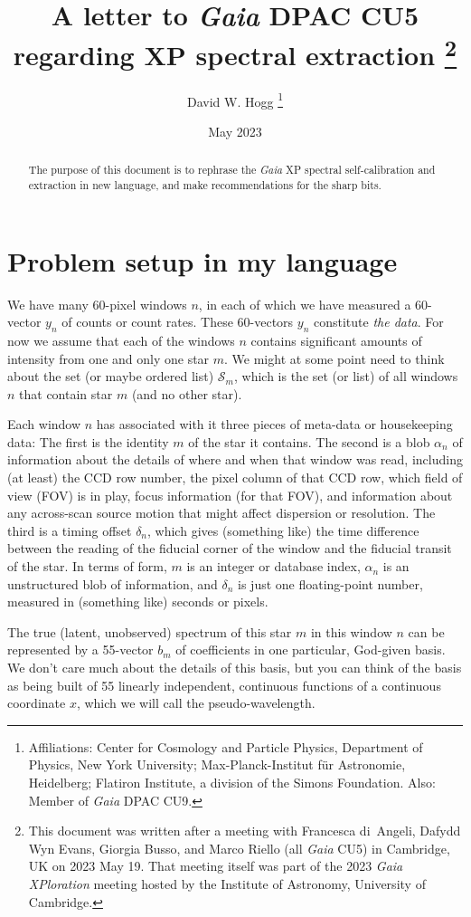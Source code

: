 \documentclass[11pt]{article}
\title{\bfseries
A letter to \textsl{Gaia} DPAC CU5 regarding XP spectral extraction%
\footnote{This document was written after a meeting with Francesca di~Angeli, Dafydd Wyn Evans, Giorgia Busso, and Marco Riello (all \textsl{Gaia} CU5) in Cambridge, UK on 2023 May 19. That meeting itself was part of the 2023 \textsl{Gaia XPloration} meeting hosted by the Institute of Astronomy, University of Cambridge.}}
\author{David W. Hogg%
\footnote{Affiliations: Center for Cosmology and Particle Physics, Department of Physics, New York University; Max-Planck-Institut f\"ur Astronomie, Heidelberg; Flatiron Institute, a division of the Simons Foundation. Also: Member of \textsl{Gaia} DPAC CU9.}}
\date{May 2023}
\begin{document}
\maketitle\thispagestyle{empty}

\begin{abstract}\noindent
    The purpose of this document is to rephrase the \textsl{Gaia} XP spectral self-calibration and extraction in new language, and make recommendations for the sharp bits.
\end{abstract}

\section{Problem setup in my language}

We have many 60-pixel windows $n$, in each of which we have measured a 60-vector $y_n$ of counts or count rates.
These 60-vectors $y_n$ constitute \emph{the data}.
For now we assume that each of the windows $n$ contains significant amounts of intensity from one and only one star $m$.
We might at some point need to think about the set (or maybe ordered list) $\mathscr{S}_m$, which is the set (or list) of all windows $n$ that contain star $m$ (and no other star).

Each window $n$ has associated with it three pieces of meta-data or housekeeping data:
The first is the identity $m$ of the star it contains.
The second is a blob $\alpha_n$ of information about the details of where and when that window was read, including (at least) the CCD row number, the pixel column of that CCD row, which field of view (FOV) is in play, focus information (for that FOV), and information about any across-scan source motion that might affect dispersion or resolution.
The third is a timing offset $\delta_n$, which gives (something like) the time difference between the reading of the fiducial corner of the window and the fiducial transit of the star.
In terms of form, $m$ is an integer or database index, $\alpha_n$ is an unstructured blob of information, and $\delta_n$ is just one floating-point number, measured in (something like) seconds or pixels.

The true (latent, unobserved) spectrum of this star $m$ in this window $n$ can be represented by a 55-vector $b_m$ of coefficients in one particular, God-given basis.
We don't care much about the details of this basis, but you can think of the basis as being built of 55 linearly independent, continuous functions of a continuous coordinate $x$, which we will call the pseudo-wavelength.
\end{document}
